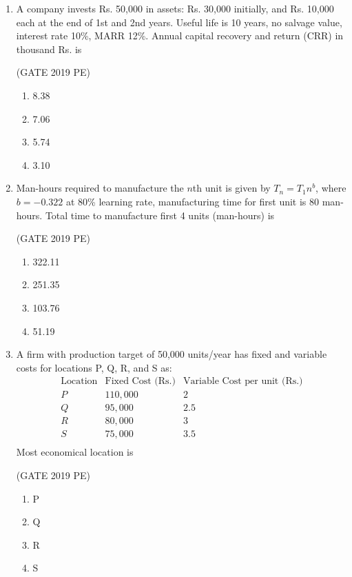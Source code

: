\documentclass[journal,12pt,onecolumn]{exam}
\theoremstyle{remark}
\begin{document}
\begin{enumerate}
\item A company invests Rs. 50,000 in assets: Rs. 30,000 initially, and Rs. 10,000 each at the end of 1st and 2nd years. Useful life is 10 years, no salvage value, interest rate 10\%, MARR 12\%. Annual capital recovery and return (CRR) in thousand Rs. is

\hfill{(GATE 2019 PE)}\\
\begin{enumerate}
    \item 8.38
    \item 7.06
    \item 5.74
    \item 3.10
\end{enumerate}

\item Man-hours required to manufacture the \(n\)th unit is given by \(T_n = T_1 n^{b}\), where \(b=-0.322\) at 80\% learning rate, manufacturing time for first unit is 80 man-hours. Total time to manufacture first 4 units (man-hours) is

\hfill{(GATE 2019 PE)}\\
\begin{enumerate}
    \item 322.11
    \item 251.35
    \item 103.76
    \item 51.19
\end{enumerate}

\item A firm with production target of 50,000 units/year has fixed and variable costs for locations P, Q, R, and S as:  
\[
\begin{array}{lll}
\text{Location} & \text{Fixed Cost (Rs.)} & \text{Variable Cost per unit (Rs.)} \\
P & 110,000 & 2 \\
Q & 95,000 & 2.5 \\
R & 80,000 & 3 \\
S & 75,000 & 3.5 \\
\end{array}
\]  
Most economical location is

\hfill{(GATE 2019 PE)}\\
\begin{enumerate}
    \item P
    \item Q
    \item R
    \item S
\end{enumerate}


\end{enumerate}
\end{document}

